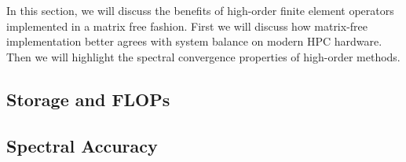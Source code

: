 In this section, we will discuss the benefits of high-order finite element operators implemented in a matrix free fashion.
First we will discuss how matrix-free implementation better agrees with system balance on modern HPC hardware.
Then we will highlight the spectral convergence properties of high-order methods.

\subsection{Storage and FLOPs}\label{sec:storageandflops}


\subsection{Spectral Accuracy}

